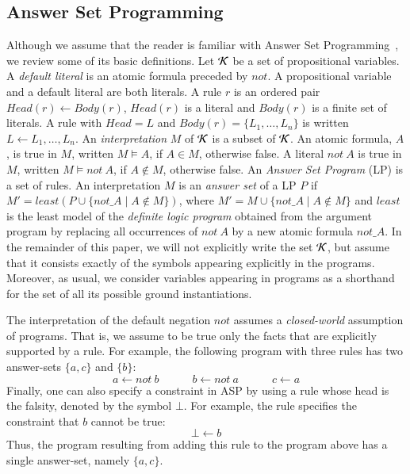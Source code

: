\documentclass{new_tlp}
\newcommand\dnot{\ensuremath{\mathit{not}}\xspace}
\begin{document}
\subsection{Answer Set Programming}

Although we assume that the reader is familiar with Answer Set Programming~\cite{gelfond90iclp}, we 
review some of its basic definitions. Let $\Kscr$ be a set of propositional 
variables. A \emph{default literal} is an atomic formula preceded by 
\dnot.  A propositional variable and a default literal are both literals. 
A rule $r$ is an ordered pair $Head(r) \leftarrow Body(r)$, $Head(r)$ is 
a literal and $Body(r)$ is a finite set of literals. A rule with $Head = L$ and 
$Body(r) = \{L_1, \ldots, L_n\}$ is written $L \leftarrow L_1, \ldots, L_n$.
An \emph{interpretation} $M$ of $\Kscr$ is a subset of $\Kscr$. An atomic formula, $A$,
is true in $M$, written $M \vDash A$, if $A \in M$, otherwise false. A literal $\dnot\ A$
is true in $M$, written $M \vDash \dnot\ A$, if $A \notin M$, otherwise false.
An \emph{Answer Set Program} (LP) is a set of rules. An interpretation $M$
is an \emph{answer set} of a LP $P$ if $M' = least(P \cup \{\dnot\_A \mid A \notin M\} )$, 
where $M' = M \cup \{\dnot\_A \mid A \notin M\}$ and $least$ is the least model 
of the \emph{definite logic program} obtained from the argument program by replacing 
all occurrences of $\dnot\ A$ by a new atomic formula $\dnot\_A$. 
In the remainder
of this paper, we will not explicitly write the set $\Kscr$, but assume that it consists
exactly of the symbols appearing explicitly in the programs. Moreover, as usual, we 
consider variables appearing in programs as a shorthand for the set of all its possible ground 
instantiations.

The interpretation of the default negation $\dnot$ assumes a
\emph{closed-world} assumption of programs. That is, we assume to be true
only the facts that are explicitly supported by a rule. For example, the
following program with three rules has two answer-sets $\{a, c\}$ and $\{b\}$:
\[
 a \leftarrow \dnot\ b \quad\qquad b \leftarrow \dnot\ a \quad\qquad c \leftarrow a
\]
Finally, 
one can also specify a constraint in ASP by using a rule whose head is the falsity, 
denoted by the symbol $\bot$. For example, the rule specifies the constraint
that $b$ cannot be true:
\[ 
\bot \leftarrow b
\]
Thus, the program resulting from adding this rule to the program above has 
a single answer-set, namely $\{a, c\}$.
\end{document}
